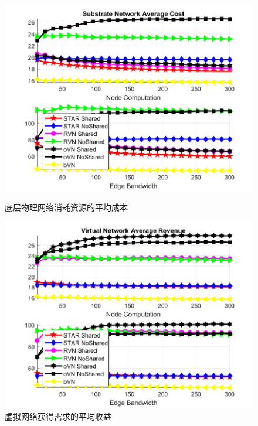 \begin{figure}[htbp]
\centering
\begin{minipage}{0.4\textwidth}
\centering
\includegraphics[width=\textwidth]{figures/CostAccumulateAverageSubstrateNetwork}
\caption{底层物理网络消耗资源的平均成本}\label{fig:CostAccumulateAverageSubstrateNetwork}
\end{minipage}
\begin{minipage}{0.4\textwidth}
\centering
\includegraphics[width=\textwidth]{figures/RevenueAccumulateAverageVirtualNetwork}
\caption{虚拟网络获得需求的平均收益}\label{fig:RevenueAccumulateAverageVirtualNetwork}
\end{minipage}\vspace{\baselineskip}
\end{figure}
